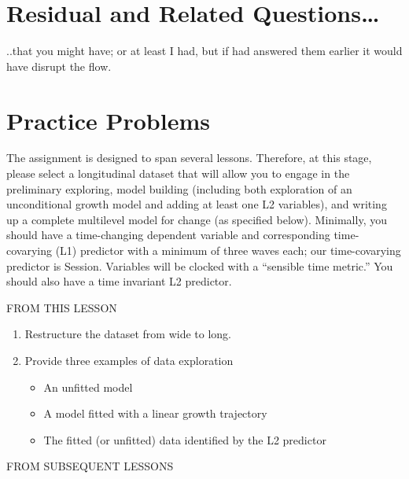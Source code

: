 \documentclass[
  11pt,
]{book}
\providecommand{\tightlist}{%
  \setlength{\itemsep}{0pt}\setlength{\parskip}{0pt}}
\begin{document}
\hypertarget{residual-and-related-questions-1}{%
\section{Residual and Related Questions\ldots{}}\label{residual-and-related-questions-1}}

..that you might have; or at least I had, but if had answered them earlier it would have disrupt the flow.

\hypertarget{practice-problems-1}{%
\section{Practice Problems}\label{practice-problems-1}}

The assignment is designed to span several lessons. Therefore, at this stage, please select a longitudinal dataset that will allow you to engage in the preliminary exploring, model building (including both exploration of an unconditional growth model and adding at least one L2 variables), and writing up a complete multilevel model for change (as specified below). Minimally, you should have a time-changing dependent variable and corresponding time-covarying (L1) predictor with a minimum of three waves each; our time-covarying predictor is Session. Variables will be clocked with a ``sensible time metric.'' You should also have a time invariant L2 predictor.

FROM THIS LESSON

\begin{enumerate}
\def\labelenumi{\arabic{enumi}.}
\tightlist
\item
  Restructure the dataset from wide to long.
\item
  Provide three examples of data exploration

  \begin{itemize}
  \tightlist
  \item
    An unfitted model
  \item
    A model fitted with a linear growth trajectory
  \item
    The fitted (or unfitted) data identified by the L2 predictor
  \end{itemize}
\end{enumerate}

FROM SUBSEQUENT LESSONS
\end{document}
